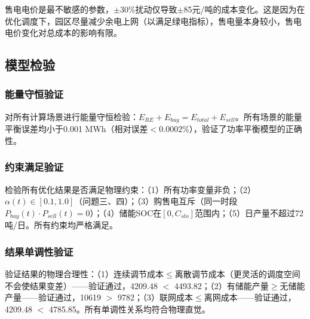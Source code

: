 售电电价是最不敏感的参数，$\pm$30\%扰动仅导致$\pm$85元/吨的成本变化。这是因为在优化调度下，园区尽量减少余电上网（以满足绿电指标），售电量本身较小，售电电价变化对总成本的影响有限。

\subsection{模型检验}

\subsubsection{能量守恒验证}

对所有计算场景进行能量守恒检验：$E_{RE} + E_{buy} = E_{total} + E_{sell}$。所有场景的能量平衡误差均小于0.001 MWh（相对误差$<$0.0002\%），验证了功率平衡模型的正确性。

\subsubsection{约束满足验证}

检验所有优化结果是否满足物理约束：（1）所有功率变量非负；（2）$\alpha(t) \in [0.1, 1.0]$（问题三、四）；（3）购售电互斥（同一时段$P_{buy}(t) \cdot P_{sell}(t) = 0$）；（4）储能SOC在$[0, C_{sto}]$范围内；（5）日产量不超过72吨/日。所有约束均严格满足。

\subsubsection{结果单调性验证}

验证结果的物理合理性：（1）连续调节成本$\leq$离散调节成本（更灵活的调度空间不会使结果变差）——验证通过，4209.48 $<$ 4493.82；（2）有储能产量$\geq$无储能产量——验证通过，10619 $>$ 9782；（3）联网成本$\leq$离网成本——验证通过，4209.48 $<$ 4785.85。所有单调性关系均符合物理直觉。
